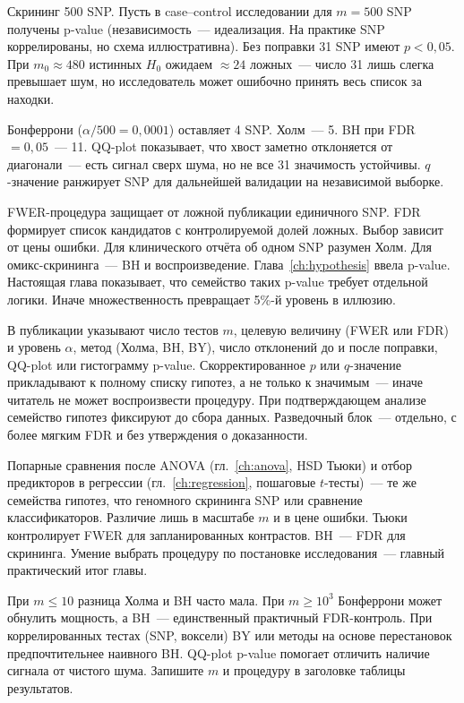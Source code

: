 Скрининг 500 SNP. Пусть в case--control исследовании для $m=500$ SNP получены p-value (независимость~--- идеализация. На практике SNP коррелированы, но схема иллюстративна). Без поправки 31 SNP имеют $p<0{,}05$. При $m_0\approx 480$ истинных $H_0$ ожидаем $\approx 24$ ложных~--- число 31 лишь слегка превышает шум, но исследователь может ошибочно принять весь список за находки.

Бонферрони ($\alpha/500=0{,}0001$) оставляет 4 SNP. Холм~--- 5. BH при FDR $=0{,}05$~--- 11. QQ-plot показывает, что хвост заметно отклоняется от диагонали~--- есть сигнал сверх шума, но не все 31 значимость устойчивы. $q$-значение ранжирует SNP для дальнейшей валидации на независимой выборке.

FWER-процедура защищает от ложной публикации единичного SNP. FDR формирует список кандидатов с контролируемой долей ложных. Выбор зависит от цены ошибки. Для клинического отчёта об одном SNP разумен Холм. Для омикс-скрининга~--- BH и воспроизведение. Глава~\ref{ch:hypothesis} ввела p-value. Настоящая глава показывает, что семейство таких p-value требует отдельной логики. Иначе множественность превращает 5\%-й уровень в иллюзию.

В публикации указывают число тестов $m$, целевую величину (FWER или FDR) и уровень $\alpha$, метод (Холма, BH, BY), число отклонений до и после поправки, QQ-plot или гистограмму p-value.
Скорректированное $p$ или $q$-значение прикладывают к полному списку гипотез, а не только к значимым~--- иначе читатель не может воспроизвести процедуру. При подтверждающем анализе семейство гипотез фиксируют до сбора данных. Разведочный блок~--- отдельно, с более мягким FDR и без утверждения о доказанности.

Попарные сравнения после ANOVA (гл.~\ref{ch:anova}, HSD Тьюки) и отбор предикторов в регрессии (гл.~\ref{ch:regression}, пошаговые $t$-тесты)~--- те же семейства гипотез, что геномного скрининга SNP или сравнение классификаторов. Различие лишь в масштабе $m$ и в цене ошибки. Тьюки контролирует FWER для запланированных контрастов. BH~--- FDR для скрининга. Умение выбрать процедуру по постановке исследования~--- главный практический итог главы.

При $m\le 10$ разница Холма и BH часто мала. При $m\ge 10^3$ Бонферрони может обнулить мощность, а BH~--- единственный практичный FDR-контроль.
При коррелированных тестах (SNP, воксели) BY или методы на основе перестановок предпочтительнее наивного BH. QQ-plot p-value помогает отличить наличие сигнала от чистого шума. Запишите $m$ и процедуру в заголовке таблицы результатов.

